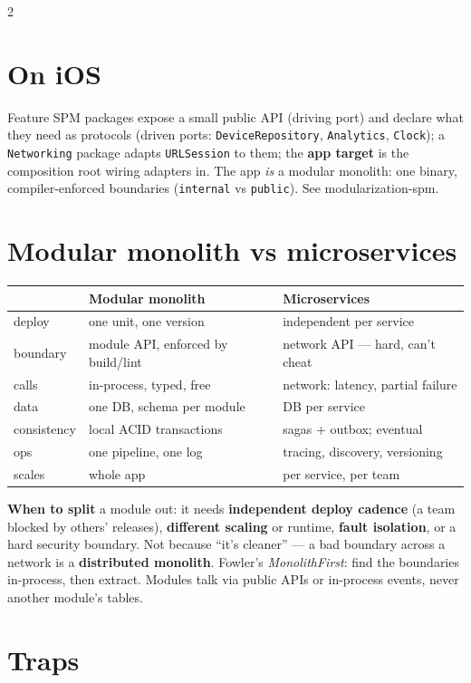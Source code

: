 \documentclass[8pt]{extarticle}
\begin{document}
\begin{multicols}{2}
\columnbreak

\section{On iOS}
Feature SPM packages expose a small public API (driving port) and declare what they
need as protocols (driven ports: \texttt{DeviceRepository}, \texttt{Analytics},
\texttt{Clock}); a \texttt{Networking} package adapts \texttt{URLSession} to them; the
\textbf{app target} is the composition root wiring adapters in. The app \emph{is} a
modular monolith: one binary, compiler-enforced boundaries (\texttt{internal} vs
\texttt{public}). See modularization-spm.

\section{Modular monolith vs microservices}
{\footnotesize
\begin{tabular}{@{}>{\raggedright\arraybackslash}p{12mm}>{\raggedright\arraybackslash}p{29mm}>{\raggedright\arraybackslash}p{31mm}@{}}
\toprule
 & \textbf{Modular monolith} & \textbf{Microservices} \\
\midrule
deploy & one unit, one version & independent per service \\
boundary & module API, enforced by build/lint & network API — hard, can't cheat \\
calls & in-process, typed, free & network: latency, partial failure \\
data & one DB, schema per module & DB per service \\
consistency & local ACID transactions & sagas + outbox; eventual \\
ops & one pipeline, one log & tracing, discovery, versioning \\
scales & whole app & per service, per team \\
\bottomrule
\end{tabular}}

\textbf{When to split} a module out: it needs \textbf{independent deploy cadence} (a team
blocked by others' releases), \textbf{different scaling} or runtime, \textbf{fault
isolation}, or a hard security boundary. Not because ``it's cleaner'' — a bad boundary
across a network is a \textbf{distributed monolith}. Fowler's \emph{MonolithFirst}: find
the boundaries in-process, then extract. Modules talk via public APIs or in-process
events, never another module's tables.

\section{Traps}
\begin{itemize}
\end{itemize}


\end{multicols}
\end{document}
